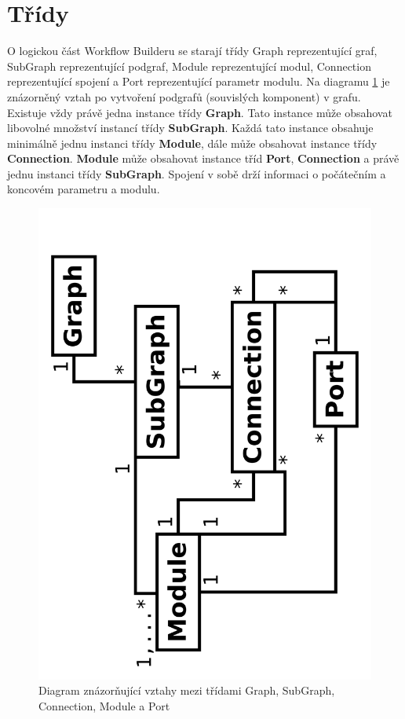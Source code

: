 \newpage
\section{Třídy}

O logickou část Workflow Builderu se starají třídy Graph
reprezentující graf, SubGraph reprezentující podgraf, Module
reprezentující modul, Connection reprezentující spojení a Port
reprezentující parametr modulu. Na diagramu \figurename \ref{logClass}
je znázorněný vztah po vytvoření podgrafů (souvislých komponent) v
grafu. Existuje vždy právě jedna instance třídy \textbf{Graph}. Tato
instance může obsahovat libovolné množství instancí
třídy \textbf{SubGraph}. Každá tato instance obsahuje minimálně jednu
instanci třídy \textbf{Module}, dále může obsahovat instance
třídy \textbf{Connection}. \textbf{Module} může obsahovat instance
tříd \textbf{Port}, \textbf{Connection} a právě jednu instanci
třídy \textbf{SubGraph}. Spojení v sobě drží informaci o počátečním a
koncovém parametru a modulu.

\begin{figure}[h]
	\begin{center}
		\includegraphics[scale=0.05,angle=-90]{pictures/wf/logClass.pdf}
		\caption{Diagram znázorňující vztahy mezi třídami Graph, SubGraph, Connection, Module a Port}
	  	\label{logClass}
	\end{center}
\end{figure}

